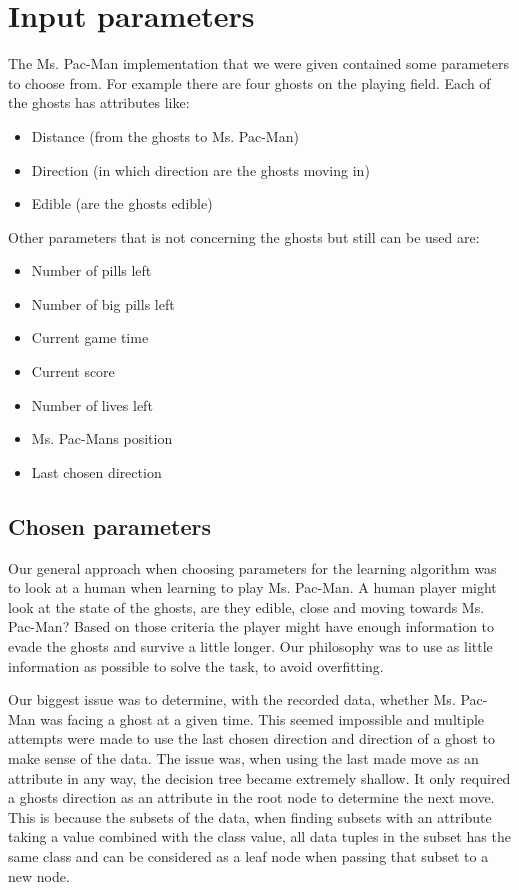 \documentclass{article}
\begin{document}
\fi
\section{Input parameters}
The Ms. Pac-Man implementation that we were given contained some parameters to choose from. For example there are four ghosts on the playing field. Each of the ghosts has attributes like:

\begin{itemize}
     \setlength\itemsep{0em}
    \item Distance (from the ghosts to Ms. Pac-Man)
    \item Direction (in which direction are the ghosts moving in)
    \item Edible (are the ghosts edible)
\end{itemize}

Other parameters that is not concerning the ghosts but still can be used are:

\begin{itemize}
    \setlength\itemsep{0em}
    \item Number of pills left
    \item Number of big pills left
    \item Current game time
    \item Current score
    \item Number of lives left
    \item Ms. Pac-Mans position
    \item Last chosen direction
\end{itemize}

    \subsection{Chosen parameters}
    Our general approach when choosing parameters for the learning algorithm was to look at a human when learning to play Ms. Pac-Man. A human player might look at the state of the ghosts, are they edible, close and moving towards Ms. Pac-Man? Based on those criteria the player might have enough information to evade the ghosts and survive a little longer. Our philosophy was to use as little information as possible to solve the task, to avoid overfitting.

    Our biggest issue was to determine, with the recorded data, whether Ms. Pac-Man was facing a ghost at a given time. This seemed impossible and multiple attempts were made to use the last chosen direction and direction of a ghost to make sense of the data. The issue was, when using the last made move as an attribute in any way, the decision tree became extremely shallow. It only required a ghosts direction as an attribute in the root node to determine the next move. This is because the subsets of the data, when finding subsets with an attribute taking a value combined with the class value, all data tuples in the subset has the same class and can be considered as a leaf node when passing that subset to a new node.
\end{document}
